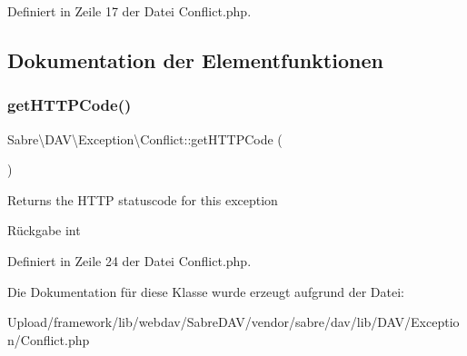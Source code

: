 Definiert in Zeile 17 der Datei Conflict.\+php.



\subsection{Dokumentation der Elementfunktionen}
\mbox{\label{class_sabre_1_1_d_a_v_1_1_exception_1_1_conflict_a2a7036b1cb526bda6374f61e93cfe1f5}} 
\subsubsection{\texorpdfstring{get\+H\+T\+T\+P\+Code()}{getHTTPCode()}}
{\footnotesize\ttfamily Sabre\textbackslash{}\+D\+A\+V\textbackslash{}\+Exception\textbackslash{}\+Conflict\+::get\+H\+T\+T\+P\+Code (\begin{DoxyParamCaption}{ }\end{DoxyParamCaption})}

Returns the H\+T\+TP statuscode for this exception

\begin{DoxyReturn}{Rückgabe}
int 
\end{DoxyReturn}


Definiert in Zeile 24 der Datei Conflict.\+php.



Die Dokumentation für diese Klasse wurde erzeugt aufgrund der Datei\+:\begin{DoxyCompactItemize}
\item 
Upload/framework/lib/webdav/\+Sabre\+D\+A\+V/vendor/sabre/dav/lib/\+D\+A\+V/\+Exception/Conflict.\+php\end{DoxyCompactItemize}
